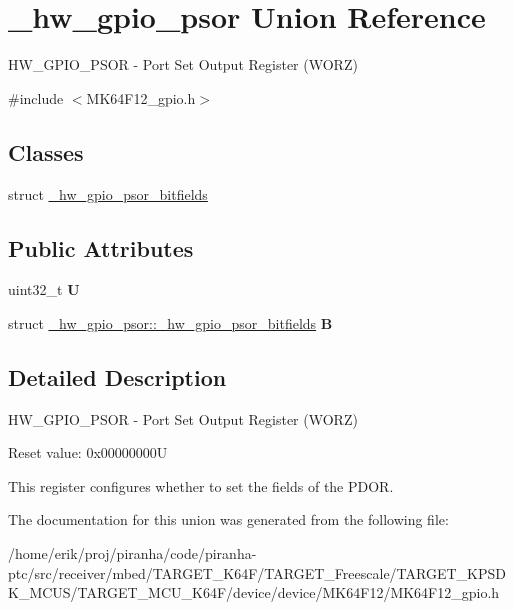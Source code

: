 \hypertarget{union__hw__gpio__psor}{}\section{\+\_\+hw\+\_\+gpio\+\_\+psor Union Reference}
\label{union__hw__gpio__psor}


H\+W\+\_\+\+G\+P\+I\+O\+\_\+\+P\+S\+OR -\/ Port Set Output Register (W\+O\+RZ)  




{\ttfamily \#include $<$M\+K64\+F12\+\_\+gpio.\+h$>$}

\subsection*{Classes}
\begin{DoxyCompactItemize}
\item 
struct \hyperlink{struct__hw__gpio__psor_1_1__hw__gpio__psor__bitfields}{\+\_\+hw\+\_\+gpio\+\_\+psor\+\_\+bitfields}
\end{DoxyCompactItemize}
\subsection*{Public Attributes}
\begin{DoxyCompactItemize}
\item 
uint32\+\_\+t {\bfseries U}\hypertarget{union__hw__gpio__psor_a716509d37814fdd20c9ff9f45514d279}{}\label{union__hw__gpio__psor_a716509d37814fdd20c9ff9f45514d279}

\item 
struct \hyperlink{struct__hw__gpio__psor_1_1__hw__gpio__psor__bitfields}{\+\_\+hw\+\_\+gpio\+\_\+psor\+::\+\_\+hw\+\_\+gpio\+\_\+psor\+\_\+bitfields} {\bfseries B}\hypertarget{union__hw__gpio__psor_a1e05287ce5a7b6de062bfd81e2ce538d}{}\label{union__hw__gpio__psor_a1e05287ce5a7b6de062bfd81e2ce538d}

\end{DoxyCompactItemize}


\subsection{Detailed Description}
H\+W\+\_\+\+G\+P\+I\+O\+\_\+\+P\+S\+OR -\/ Port Set Output Register (W\+O\+RZ) 

Reset value\+: 0x00000000U

This register configures whether to set the fields of the P\+D\+OR. 

The documentation for this union was generated from the following file\+:\begin{DoxyCompactItemize}
\item 
/home/erik/proj/piranha/code/piranha-\/ptc/src/receiver/mbed/\+T\+A\+R\+G\+E\+T\+\_\+\+K64\+F/\+T\+A\+R\+G\+E\+T\+\_\+\+Freescale/\+T\+A\+R\+G\+E\+T\+\_\+\+K\+P\+S\+D\+K\+\_\+\+M\+C\+U\+S/\+T\+A\+R\+G\+E\+T\+\_\+\+M\+C\+U\+\_\+\+K64\+F/device/device/\+M\+K64\+F12/M\+K64\+F12\+\_\+gpio.\+h\end{DoxyCompactItemize}
